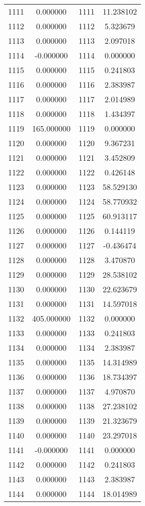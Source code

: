\documentclass[12pt]{article}
\begin{document}
\begin{longtable}{@{}cccc@{}}
1111 & 0.000000 & 1111 & 11.238102 \\
1112 & 0.000000 & 1112 & 5.323679 \\
1113 & 0.000000 & 1113 & 2.097018 \\
1114 & -0.000000 & 1114 & 0.000000 \\
1115 & 0.000000 & 1115 & 0.241803 \\
1116 & 0.000000 & 1116 & 2.383987 \\
1117 & 0.000000 & 1117 & 2.014989 \\
1118 & 0.000000 & 1118 & 1.434397 \\
1119 & 165.000000 & 1119 & 0.000000 \\
1120 & 0.000000 & 1120 & 9.367231 \\
1121 & 0.000000 & 1121 & 3.452809 \\
1122 & 0.000000 & 1122 & 0.426148 \\
1123 & 0.000000 & 1123 & 58.529130 \\
1124 & 0.000000 & 1124 & 58.770932 \\
1125 & 0.000000 & 1125 & 60.913117 \\
1126 & 0.000000 & 1126 & 0.144119 \\
1127 & 0.000000 & 1127 & -0.436474 \\
1128 & 0.000000 & 1128 & 3.470870 \\
1129 & 0.000000 & 1129 & 28.538102 \\
1130 & 0.000000 & 1130 & 22.623679 \\
1131 & 0.000000 & 1131 & 14.597018 \\
1132 & 405.000000 & 1132 & 0.000000 \\
1133 & 0.000000 & 1133 & 0.241803 \\
1134 & 0.000000 & 1134 & 2.383987 \\
1135 & 0.000000 & 1135 & 14.314989 \\
1136 & 0.000000 & 1136 & 18.734397 \\
1137 & 0.000000 & 1137 & 4.970870 \\
1138 & 0.000000 & 1138 & 27.238102 \\
1139 & 0.000000 & 1139 & 21.323679 \\
1140 & 0.000000 & 1140 & 23.297018 \\
1141 & -0.000000 & 1141 & 0.000000 \\
1142 & 0.000000 & 1142 & 0.241803 \\
1143 & 0.000000 & 1143 & 2.383987 \\
1144 & 0.000000 & 1144 & 18.014989 \\

\end{longtable}
\end{document}
